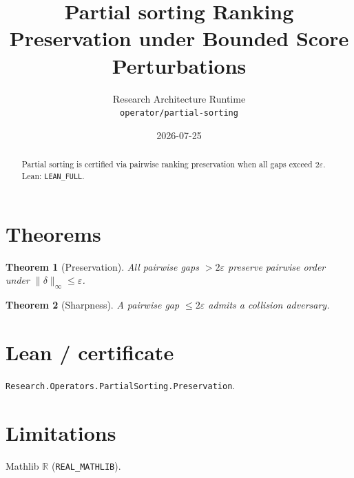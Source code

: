 \documentclass[11pt]{article}
\title{Partial sorting Ranking Preservation under Bounded Score Perturbations}
\author{Research Architecture Runtime \\ \texttt{operator/partial-sorting}}
\date{2026-07-25}
\newtheorem{theorem}{Theorem}
\begin{document}
\maketitle
\begin{abstract}
Partial sorting is certified via pairwise ranking preservation when all gaps exceed $2\varepsilon$. Lean: \texttt{LEAN\_FULL}.
\end{abstract}
\section{Theorems}
\begin{theorem}[Preservation]
All pairwise gaps $>2\varepsilon$ preserve pairwise order under $\|\delta\|_\infty\le\varepsilon$.
\end{theorem}
\begin{theorem}[Sharpness]
A pairwise gap $\le 2\varepsilon$ admits a collision adversary.
\end{theorem}
\section{Lean / certificate}
\texttt{Research.Operators.PartialSorting.Preservation}.
\section{Limitations}
Mathlib $\mathbb{R}$ (\texttt{REAL\_MATHLIB}).
\end{document}
